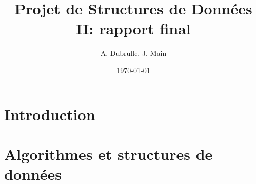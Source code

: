 \documentclass[a4paper, 12pt]{article}
\title{Projet de Structures de Données II: rapport final}
\author{A. Dubrulle, J. Main}
\date{\today}
\theoremstyle{definition} \newtheorem{df}{D\'{e}finition}[section]
\theoremstyle{definition} \newtheorem{ex}[df]{Exemple}
\theoremstyle{definition} \newtheorem{thm}[df]{Th\'{e}or\`{e}me}
\theoremstyle{definition} \newtheorem{cor}[df]{Corollaire}
\theoremstyle{definition} \newtheorem{lem}[df]{Lemme}
\theoremstyle{definition} \newtheorem{prop}[df]{Proposition}
\theoremstyle{definition} \newtheorem{rem}[df]{Remarque}
\begin{document}
\maketitle
\tableofcontents
\section{Introduction}


\section{Algorithmes et structures de données}

\end{document}
